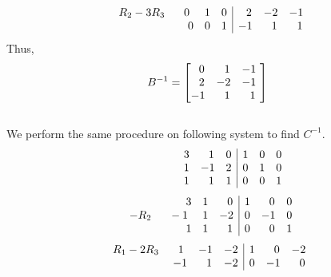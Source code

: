 \documentclass[12pt]{amsart}
\begin{document}
\begin{enumerate}
\begin{align}
\begin{array}{ccc|ccc}
				\hspace{0.1cm} R_2-3R_3 \hspace{0.6cm} 0 &1 &0 &\text{ } \text{ }2 &-2 &-1 \\
				\hspace{2.4cm} 0& 0&1 &-1 &\text{ } \text{ }1 &\text{ } \text{ }1
			\end{array} \notag
		\end{align} 
		Thus,
		\begin{align}
			B^{-1}=
			\begin{bmatrix}
				\text{ } \text{ }0 &\text{ } \text{ }1 &-1 \text{ } \\
				\text{ } \text{ }2 &-2 &-1 \text{ } \\
				-1 &\text{ } \text{ }1 &\text{ } \text{ }1 \text{ }
			\end{bmatrix} \notag
		\end{align} \\
		We perform the same procedure on following system to find $C^{-1}$.
		\begin{align}
			\begin{array}{ccc|ccc}
				\hspace{1.6cm} 3 &\text{ } \text{ }1 &0 &1 &0 &0 \\
				\hspace{1.6cm} 1 &-1 &2 &0 &1 &0  \\
				\hspace{1.6cm} 1 &\text{ } \text{ }1 &1 &0 &0 &1
			\end{array} \notag
		\end{align} 
		\begin{align}
			\begin{array}{ccc|ccc}
				\hspace{2cm} 3 &1 &\text{ } \text{ }0 &1 &\text{ } \text{ }0 &0 \\
				\hspace{0.1cm} -R_2\hspace{0.55cm} -1 &1 &-2 &0 &-1 &0  \\
				\hspace{2cm} 1 &1 &\text{ } \text{ }1 &0 &\text{ } \text{ }0 &1
			\end{array} \notag
		\end{align} 
		\begin{align}
			\begin{array}{ccc|ccc}
				R_1-2R_3 \hspace{0.6cm} 1 &-1 &-2 &1 &\text{ } \text{ }0 &-2 \\
				\hspace{2cm} -1 &\text{ } \text{ }1 &-2 &0 &-1 &\text{ } \text{ }0  \\

\end{array}
\end{align}
\end{enumerate}
\end{document}
